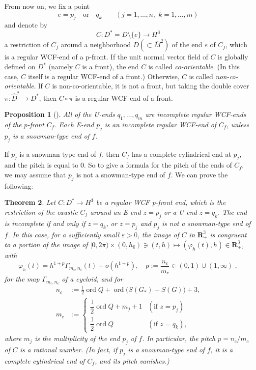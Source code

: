 \documentclass[a4paper]{amsart}
\theoremstyle{plain}
\newtheorem{theorem}{Theorem}[section]
\newtheorem{proposition}[theorem]{Proposition}
\theoremstyle{remark}
\numberwithin{equation}{section}
\begin{document}
From now on, we fix a point
\[
   e=p_j \quad \mbox{or} \quad 
   q_k \qquad (j=1,\dots, n,\,\, k=1,\dots,m)
\]
and denote by
\[
    C:D^*=D\setminus \{e\} \longrightarrow H^3
\]
a restriction of $C_f$ around a neighborhood $D(\subset \overline{M}^2)$ 
of the end $e$ of $C_f$, which is a regular WCF-end of a p-front.
If the unit normal vector field of $C$ is globally
defined on $D^*$ (namely $C$ is a front), 
the end $C$ is called {\it co-orientable}.
(In this case, $C$ itself is a regular WCF-end of a front.)
Otherwise, $C$ is called {\it non-co-orientable}.
If $C$ is non-co-orientable, it is not a front, but
taking the double cover $\pi:\hat D^*\to D^*$, then
$C\circ \pi$ is a regular WCF-end of a front.
\begin{proposition}[{\cite[Theorems 7.4 and 7.6]{KRUY}}]
 All of the U-ends $q_1,\dots,q_m$ 
 are incomplete regular WCF-ends of the $p$-front $C_f$.
 Each E-end $p_j$ is an incomplete regular WCF-end
 of $C_f$, unless $p_j$ is a snowman-type end of $f$.
\end{proposition}
If $p_j$ is a snowman-type end of $f$,
then $C_f$ has a complete cylindrical end at $p_j$,
and the pitch is equal to $0$.
So to give a formula for the pitch of the ends of $C_f$,
we may assume that $p_j$ is not a snowman-type end of $f$.
We can prove the following: 
\begin{theorem}\label{thm:Sec5}
 Let $C:D^*\to H^3$ be a regular WCF p-front end, which is
 the restriction of the caustic $C_f$
 around an E-end $z=p_j$ or a U-end $z=q_k$.
 The end is incomplete if and only if 
 $z = q_k$, or $z=p_j$ and $p_j$ is not a 
 snowman-type end of $f$.
 In this case,
 for a sufficiently small $\varepsilon>0$, 
 the image of $C$ in ${\boldsymbol{R}}^3_+$
 is congruent to a portion of the image of 
 $[0,2\pi) \times (0,h_0) \ni (t,h)\mapsto (\varphi_h(t),h)\in {\boldsymbol{R}}_+^3$,
 with
 \begin{equation}\label{eq:asymp-incomplete-2}
    \varphi_h(t)=
             h^{1+p}{\varGamma}_{m_c,n_c}(t)+o(h^{1+p}),
	     \quad p:=\frac{n_c}{m_c}\in (0,1)\cup (1,\infty) \;,
 \end{equation}
 for the map ${\varGamma}_{m_c,n_c}$ of a cycloid,
and for 
 \begin{align*}
       n_c&:=\frac1{2}{\operatorname{ord}} Q+{\operatorname{ord}}\bigl(S(G_*)-S(G)\bigl)+3, \\
       m_c&:=
       \begin{cases}
	  \dfrac12{\operatorname{ord}} Q+m_j +1 & (\mbox{if $z=p_j$}) \\[6pt]
	  \dfrac12{\operatorname{ord}} Q & (\mbox{if $z=q_k$}), 
       \end{cases}
 \end{align*}
where 
$m_j$ is the multiplicity of the end $p_j$ of
 $f$.
 In particular, the pitch $p=n_c/m_c$
 of $C$ is a rational number.
 {\rm (}In fact, if $p_j$ is a snowman-type end of $f$, it is
 a complete cylindrical end of $C_f$, and
 its pitch vanishes.{\rm )}
\end{theorem}
\end{document}
